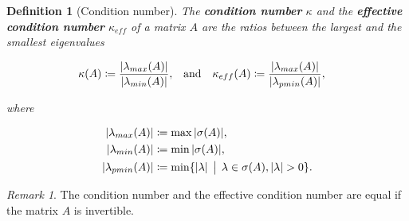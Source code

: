 \documentclass{article}
\theoremstyle{plain} %
\newtheorem{definition}{Definition}[section]
\theoremstyle{convention} %
\theoremstyle{remark} %
\newtheorem*{remark}{Remark} %
\def\df#1{\textbf{\textit{#1}}}
\numberwithin{equation}{section}
\begin{document}
\begin{definition}[Condition number]

The \df{condition number} $\kappa$ and the \df{effective condition number} $\kappa_{eff}$ of a matrix $A$ are the ratios between the largest and the smallest eigenvalues

\begin{align*}
    \kappa(A) &\coloneqq \frac{\abs{\lambda_{max}(A)}}{\abs{\lambda_{min}(A)}},
    & &\text{and} &
    \kappa_{eff}(A) &\coloneqq \frac{\abs{\lambda_{max}(A)}}{\abs{\lambda_{pmin}(A)}},
\end{align*}

where

\begin{align*}
  \abs{\lambda_{max}(A)} &\coloneqq \max \abs{\sigma(A)}, \\
  \abs{\lambda_{min}(A)} &\coloneqq \min \abs{\sigma(A)}, \\
  \abs{\lambda_{pmin}(A)} &\coloneqq \min \{ \abs{\lambda} \, \bigm\lvert \, \lambda \in \sigma(A), \abs{\lambda} > 0 \}.
\end{align*}

\end{definition}

\begin{remark}
The condition number and the effective condition number are equal if the matrix $A$ is invertible.
\end{remark}
\end{document}

